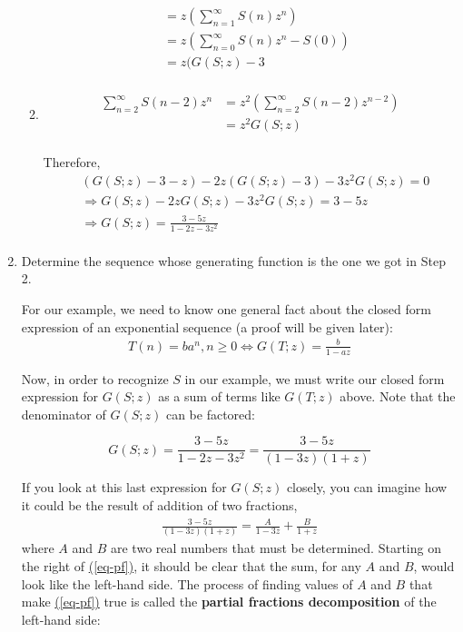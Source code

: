 \documentclass[10pt,]{book}
\newcommand{\terminology}[1]{\textbf{#1}}
\theoremstyle{plain}
\theoremstyle{definition}
\theoremstyle{definition}
\theoremstyle{definition}
\theoremstyle{definition}
\numberwithin{equation}{section}
\begin{document}
\begin{enumerate}[label=\arabic*]
\begin{enumerate}[label=\alph*]
\begin{equation*}
\begin{split}
		& =z(\sum_{n=1}^{\infty} S(n) z^n)\\
		& = z(\sum_{n=0}^{\infty} S(n) z^n-S(0))\\
		&= z(G(S;z)-3\\\
\end{split}
\end{equation*}
%
\item\hypertarget{li-69}{}
\begin{equation*}
\begin{split}
\sum_{n=2}^{\infty} S(n-2) z^n  & = z^2(\sum_{n=2}^{\infty} S(n-2) z^{n-2})\\
	& =z^2G(S;z)\\
\end{split}
\end{equation*}
%
\par
Therefore, 
\begin{equation*}
\begin{split}
&(G(S;z)-3-z)-2z(G(S;z)-3)-3z^2G(S;z)=0\\
	 & \Rightarrow G(S;z)-2z G(S;z)-3z^2G(S;z)=3 - 5z\\
		&\Rightarrow G(S;z)=\frac{3-5z}{1-2z-3z^2}\\
\end{split}
\end{equation*}
%
\end{enumerate}
%
\item\hypertarget{li-70}{}Determine the sequence whose generating function is the one we got in Step 2.%
\par
For our example, we need to know one general fact about the closed form expression of an exponential sequence (a proof will be given later):
\begin{gather}
T(n)=b a^n ,n\geq 0 \Leftrightarrow G(T;z)=\frac{b}{1-a z} \label{gf-of-exp}
\end{gather}
%
\par
Now, in order to recognize \(S\) in our example, we must write our closed form expression for \(G(S;z)\) as a sum of terms like \(G(T;z)\) above. Note that the denominator of \(G(S;z)\) can be factored:

 \[G(S;z)=\frac{3-5z}{1-2z-3z^2} =\frac{3-5z}{(1-3z)(1+z)}\]

If you look at this last expression for \(G(S;z)\) closely, you can imagine how it could be the result of addition of two fractions,
\begin{gather}
\frac{3-5z}{(1-3z)(1+z)} = \frac{A}{1-3z}+ \frac{B}{1+z}
\label{eq-pf}
\end{gather}
where \(A\) and \(B\) are two real numbers that must be determined. Starting on the right of \hyperref[eq-pf]{(\ref{eq-pf})}, it should be clear that the sum, for
any \(A\) and \(B\), would look like the left-hand side. The process of finding values of \(A\) and \(B\) that make \hyperref[eq-pf]{(\ref{eq-pf})}
true is called the \terminology{partial fractions decomposition} of the left-hand side:


\end{enumerate}
\end{document}
